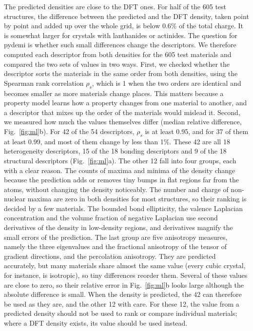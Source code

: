 \documentclass[journal=jctcce,manuscript=article,email=true]{achemso}
\newcommand{\rev}[1]{{\color{blue}#1}}
\begin{document}
The predicted densities are close to the DFT ones. For half of the 605
test structures, the difference between the predicted and the DFT density, taken
point by point and added up over the whole grid, is below 0.6\% of the total
charge. It
is somewhat larger for crystals with lanthanides or actinides. The question for
pydemi is whether such small differences change the descriptors. We
therefore computed each descriptor from both densities for the 605 test
materials and compared the two sets of values in two ways. First, we checked
whether the descriptor sorts the materials in the same order from both
densities, using the Spearman rank correlation $\rho_s$, which is 1 when the two
orders are identical and becomes smaller as more materials change places. This
matters because a property model learns how a property changes from one material
to another, and a descriptor that mixes up the order of the materials would
mislead it. Second, we measured how much the values themselves differ (median
relative difference, Fig.~\ref{fig:ml}b). For \rev{42 of the 54} descriptors, $\rho_s$
is at least 0.95, and for 37 of them at least 0.99, and most of them change by
less than 1\%. These \rev{42} are all 18 heterogeneity descriptors, \rev{15} of the 18
bonding descriptors and \rev{9} of the \rev{18} structural descriptors (Fig.~\ref{fig:ml}a). The other \rev{12} fall into four groups, each with a
clear reason. The counts of maxima and minima of the density change because the
prediction adds or removes tiny bumps in flat regions far from the atoms,
without changing the density noticeably. The number and charge of non-nuclear
maxima are zero in both densities for most structures, so their ranking is
decided by a few materials. The bounded bond ellipticity\rev{, the valence Laplacian concentration} and the volume
fraction of negative Laplacian use second derivatives of the density in
low-density regions, and derivatives magnify the small errors of the
prediction. The last group are five anisotropy measures, namely the three eigenvalues and the
fractional anisotropy of the tensor of gradient directions, and the percolation
anisotropy. They are predicted accurately, but many materials share almost the
same value (every cubic crystal, for instance, is isotropic), so tiny
differences reorder them. Several of these values are close to zero, so their
relative error in Fig.~\ref{fig:ml}b looks large although the absolute
difference is small. When
the density is predicted, the \rev{42} can therefore be used as they are, and the
other \rev{12} with care. For these \rev{12}, the value from a predicted density
should not be used to rank or compare individual materials; where a DFT
density exists, its value should be used instead.
\end{document}
